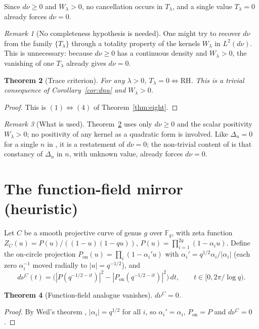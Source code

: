 \documentclass[11pt]{amsart}
\newtheorem{theorem}{Theorem}[section]
\theoremstyle{definition}
\theoremstyle{remark}
\newtheorem{remark}[theorem]{Remark}
\newcommand{\RH}{\mathrm{RH}}
\newcommand{\dnu}{d\nu}
\newcommand{\Tlam}{T_\lambda}
\newcommand{\Wlam}{W_\lambda}
\begin{document}
Since $\dnu\ge0$ and $\Wlam>0$, no cancellation occurs in $\Tlam$, and a single value
$\Tlam=0$ already forces $\dnu=0$.

\begin{remark}[No completeness hypothesis is needed]\label{def:completeness}
One might try to recover $\dnu$ from the family $\{\Tlam\}$ through a totality property of the
kernels $\Wlam$ in $L^2(\dnu)$. This is unnecessary: because $\dnu\ge0$ has a continuous density
and $\Wlam>0$, the vanishing of one $\Tlam$ already gives $\dnu=0$.
\end{remark}

\begin{theorem}[Trace criterion]\label{thm:trace-crit}
For any $\lambda>0$, $\Tlam=0\iff\RH$. This is a trivial consequence of
Corollary~\ref{cor:dnu} and $\Wlam>0$.
\end{theorem}
\begin{proof}
This is $(1)\Leftrightarrow(4)$ of Theorem~\ref{thm:eight}.
\end{proof}

\begin{remark}[What is used]\label{rem:notused}
Theorem~\ref{thm:trace-crit} uses only $\dnu\ge0$ and the scalar positivity $\Wlam>0$; no
positivity of any kernel as a quadratic form is involved. Like $\Delta_n=0$ for a single $n$ in
\cite{MomentRigidity}, it is a restatement of $\dnu=0$; the non-trivial content of
\cite{MomentRigidity} is that constancy of $\Delta_n$ in $n$, with unknown value, already forces
$\dnu=0$.
\end{remark}

\section{The function-field mirror (heuristic)}\label{sec:weil}

Let $C$ be a smooth projective curve of genus $g$ over $\mathbb F_q$, with zeta function
$Z_C(u)=P(u)/((1-u)(1-qu))$, $P(u)=\prod_{i=1}^{2g}(1-\alpha_iu)$. Define the on-circle
projection $P_{\mathrm{on}}(u)=\prod_i(1-\alpha_i'u)$ with $\alpha_i'=q^{1/2}\alpha_i/|\alpha_i|$
(each zero $\alpha_i^{-1}$ moved radially to $|u|=q^{-1/2}$), and
\[
\dnu^C(t)=\bigl(|P(q^{-1/2-it})|^2-|P_{\mathrm{on}}(q^{-1/2-it})|^2\bigr)\,dt,\qquad
t\in[0,2\pi/\log q).
\]

\begin{theorem}[Function-field analogue vanishes]\label{thm:ff}
$\dnu^C=0$.
\end{theorem}
\begin{proof}
By Weil's theorem \cite{Weil48}, $|\alpha_i|=q^{1/2}$ for all $i$, so $\alpha_i'=\alpha_i$,
$P_{\mathrm{on}}=P$ and $\dnu^C=0$.
\end{proof}
\end{document}
